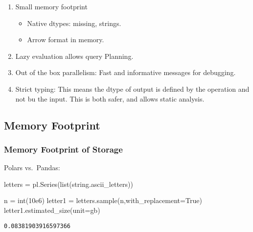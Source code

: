 \documentclass[
  letterpaper,
  DIV=11,
  numbers=noendperiod]{scrartcl}
\newenvironment{Shaded}{\begin{snugshade}}{\end{snugshade}}
\newcommand{\BuiltInTok}[1]{\textcolor[rgb]{0.00,0.23,0.31}{#1}}
\newcommand{\FloatTok}[1]{\textcolor[rgb]{0.68,0.00,0.00}{#1}}
\newcommand{\NormalTok}[1]{\textcolor[rgb]{0.00,0.23,0.31}{#1}}
\newcommand{\OperatorTok}[1]{\textcolor[rgb]{0.37,0.37,0.37}{#1}}
\newcommand{\StringTok}[1]{\textcolor[rgb]{0.13,0.47,0.30}{#1}}
\newcommand{\VariableTok}[1]{\textcolor[rgb]{0.07,0.07,0.07}{#1}}
\providecommand{\tightlist}{%
  \setlength{\itemsep}{0pt}\setlength{\parskip}{0pt}}\usepackage{longtable,booktabs,array}
\begin{document}
\begin{enumerate}
\def\labelenumi{\arabic{enumi}.}
\tightlist
\item
  Small memory footprint

  \begin{itemize}
  \tightlist
  \item
    Native dtypes: missing, strings.
  \item
    Arrow format in memory.
  \end{itemize}
\item
  Lazy evaluation allows query Planning.
\item
  Out of the box parallelism: Fast and informative messages for
  debugging.
\item
  Strict typing: This means the dtype of output is defined by the
  operation and not bu the input. This is both safer, and allows static
  analysis.
\end{enumerate}

\hypertarget{memory-footprint}{%
\subsection{Memory Footprint}\label{memory-footprint}}

\hypertarget{memory-footprint-of-storage}{%
\subsubsection{Memory Footprint of
Storage}\label{memory-footprint-of-storage}}

Polars vs.~Pandas:

\begin{Shaded}
\begin{Highlighting}[]
\NormalTok{letters }\OperatorTok{=}\NormalTok{ pl.Series(}\BuiltInTok{list}\NormalTok{(string.ascii\_letters))}

\NormalTok{n }\OperatorTok{=} \BuiltInTok{int}\NormalTok{(}\FloatTok{10e6}\NormalTok{)}
\NormalTok{letter1 }\OperatorTok{=}\NormalTok{ letters.sample(n,with\_replacement}\OperatorTok{=}\VariableTok{True}\NormalTok{)}
\NormalTok{letter1.estimated\_size(unit}\OperatorTok{=}\StringTok{\textquotesingle{}gb\textquotesingle{}}\NormalTok{)}
\end{Highlighting}
\end{Shaded}

\begin{verbatim}
0.08381903916597366
\end{verbatim}
\end{document}
